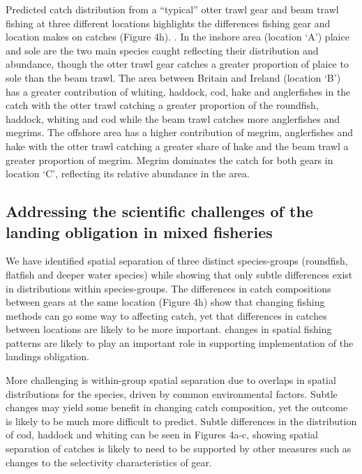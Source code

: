 \documentclass{nature}
\begin{document}
Predicted catch distribution from a ``typical'' otter trawl gear and beam trawl
fishing at three different locations highlights the differences fishing gear
and location makes on catches (Figure 4h). . In the inshore area (location `A') plaice and
sole are the two main species  caught reflecting their distribution
and abundance, though the otter trawl gear catches a greater proportion of
plaice to sole than the beam trawl.  The area between Britain and Ireland
(location `B') has a greater contribution of whiting, haddock, cod, hake and
anglerfishes in the catch with the otter trawl catching a greater proportion of
the roundfish, haddock, whiting and cod while the beam trawl catches more
anglerfishes and megrims. The offshore area has a higher contribution of
megrim, anglerfishes and hake with the otter trawl catching a greater share of
hake and the beam trawl a greater proportion of megrim. Megrim dominates the
catch for both gears in location `C', reflecting its relative abundance in the
area.  

\subsection{Addressing the scientific challenges of the landing obligation in
	mixed fisheries}  We have
identified spatial separation of three distinct species-groups (roundfish,
flatfish and deeper water species) while showing that only subtle differences
exist in distributions within species-groups. The differences in catch
compositions between gears at the same location (Figure 4h) show that changing
fishing methods can go some way to affecting catch, yet that differences in
catches between locations are likely to be more important. 
 changes in spatial fishing patterns are likely to
play an important role in supporting implementation of the landings obligation.

More challenging is within-group spatial separation due to
 overlaps in spatial distributions for the species, driven
by common environmental factors. Subtle changes may yield some benefit in
changing catch composition, yet the outcome is likely to be much more difficult
to predict.  Subtle differences in the distribution of
cod, haddock and whiting can be seen in Figures 4a-c, showing spatial
separation of catches is 
likely to need to be supported by other measures such as changes to the
selectivity characteristics of gear\cite{Santos2016}. 
\end{document}
